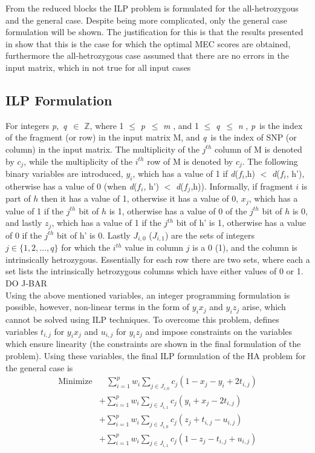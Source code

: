 \documentclass[10pt,twocolumn]{witseiepaper}
\newcommand{\M}{\textit{m }}
\newcommand{\N}{\textit{n }}
\newcommand{\D}{\textit{d}}
\newcommand{\PP}{\textit{p}}
\newcommand{\QQ}{\textit{q}}
\begin{document}
From the reduced blocks the ILP problem is formulated for the all-hetrozygous and the general case. Despite
being more complicated, only the general case formulation will be shown. The justification for this is that  
the results presented in \cite{chen:2013} show that this is the case for which the optimal MEC scores are 
obtained, furthermore the all-hetrozygous case assumed that there are no errors in the input matrix, which
in not true for all input cases

\subsection{ ILP Formulation } \label{ssec:ilpform}

For integers \PP,\ \QQ\ $\in$ $\mathbb{Z}$, where 1 $\le$ \PP\ $\le$ \M, and 1 $\le$ \QQ\ $\le$ \N, \PP\ is the 
index of the fragment (or row) in the input matrix M, and \QQ\ is the index of SNP (or column) in the input 
matrix. The multiplicity of the $j^{th}$ column of M is denoted by $c_j$, while the multiplicity of the
$i^{th}$ row of M is denoted by $c_j$. The following binary variables are introduced, $y_i$, which has a value of 1
if \D($f_i$,h) $<$ \D($f_i$, h'), otherwise has a value of 0 (when \D($f_i$, h') $<$ \D($f_j$,h)). Informally,
if fragment $i$ is part of $h$ then it has a value of 1, otherwise it has a value of 0, $x_j$, which has a 
value of 1 if the $j^{th}$ bit of $h$ is 1, otherwise has a value of 0 of the $j^{th}$ bit of $h$ is 0, and
lastly $z_j$, which has a value of 1 if the $j^{th}$ bit of h' is 1, otherwise has a value of 0 if the
$j^{th}$ bit of h' is 0. Lastly $J_{i,0}$ ($J_{i,1}$) are the sets of integers $j \in \{1,2,...,q\}$ for which 
the $i^{th}$ value in column $j$ is a 0 (1), and the column is intrinsically hetrozygous. Essentially for each
row there are two sets, where each a set lists the intrinsically hetrozygous columns which have either values 
of 0 or 1. DO J-BAR \\
Using the above mentioned variables, an integer programming formulation is possible, however, non-linear 
terms in the form of $y_ix_j$ and $y_iz_j$ arise, which cannot be solved using ILP techniques. To overcome
this problem, \cite{chen:2013} defines variables $t_{i,j}$ for $y_ix_j$ and $u_{i,j}$ for $y_iz_j$ and impose
constraints on the variables which ensure linearity (the constraints are shown in the final formulation of the
problem). Using these variables, the final ILP formulation of the HA problem for the general case is 
\begin{equation*}
\begin{split}
    \textrm{Minimize} 
    &\ \ \ \ \sum_{i = 1}^{p}{w_i} \sum_{j \in J_{i, 0} }^{}{c_j(1 - x_j - y_i + 2t_{i,j})}     \\
    &+ \sum_{i = 1}^{p}{w_i} \sum_{j \in J_{i, 1}}^{}{c_j(y_i + x_j - 2t_{i,j})}                \\
    &+ \sum_{i = 1}^{p}{w_i} \sum_{j \in J_{i, 0}}^{}{c_j(z_j + t_{i,j} - u_{i,j})}             \\
    &+ \sum_{i = 1}^{p}{w_i} \sum_{j \in J_{i, 1}}^{}{c_j(1 - z_j - t_{i,j} + u_{i,j})}
\end{split}
\end{equation*}
\end{document}
